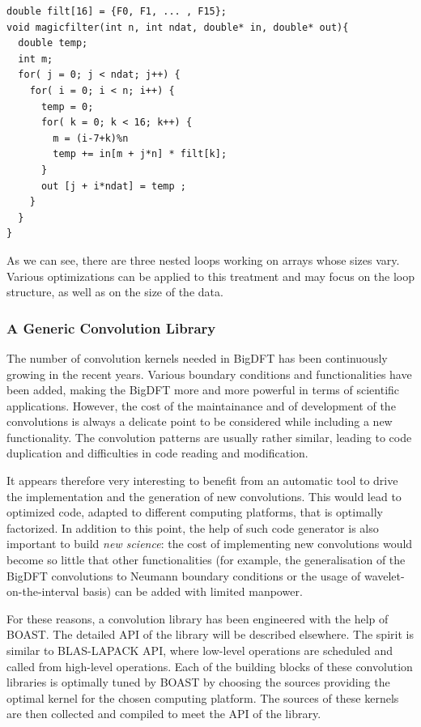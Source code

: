 \documentclass[11pt, a4paper, twoside]{montblanc}
\begin{document}
\begin{lstlisting}
double filt[16] = {F0, F1, ... , F15};
void magicfilter(int n, int ndat, double* in, double* out){
  double temp;
  int m;
  for( j = 0; j < ndat; j++) {
    for( i = 0; i < n; i++) {
      temp = 0;
      for( k = 0; k < 16; k++) {
        m = (i-7+k)%n
        temp += in[m + j*n] * filt[k];
      }
      out [j + i*ndat] = temp ;
    } 
  }
} 
\end{lstlisting}

As we can see, there are three nested loops working on arrays whose sizes vary.
Various optimizations can be applied to this treatment and may focus on the
loop structure, as well as on the size of the data. 

    \subsubsection{A Generic Convolution Library}

The number of convolution kernels needed in BigDFT has been continuously
growing in the recent years.  Various boundary conditions and functionalities
have been added, making the BigDFT more and more powerful in terms of
scientific applications.  However, the cost of the maintainance and of
development of the convolutions is always a delicate point to be considered
while including a new functionality.  The convolution patterns are usually
rather similar, leading to code duplication and difficulties in code reading
and modification.

It appears therefore very interesting to benefit from an automatic tool to drive
the implementation and the generation of new convolutions.  This would lead to
optimized code, adapted to  different computing platforms, that is optimally
factorized.  In addition to this point, the help of such code generator is also
important to build \emph{new science}: the cost of implementing new
convolutions would become so little that other functionalities (for example,
the generalisation of the BigDFT convolutions to Neumann boundary conditions
or the usage of wavelet-on-the-interval basis) can be added with limited
manpower.

For these reasons, a convolution library has been engineered with the help of
BOAST.  The detailed API of the library will be described elsewhere.  The
spirit is similar to BLAS-LAPACK API, where low-level operations are scheduled
and called from high-level operations.  Each of the building blocks of these
convolution libraries is optimally tuned by BOAST by choosing the sources
providing the optimal kernel for the chosen computing platform.  The sources of
these kernels are then collected and compiled to meet the API of the library.
\end{document}

